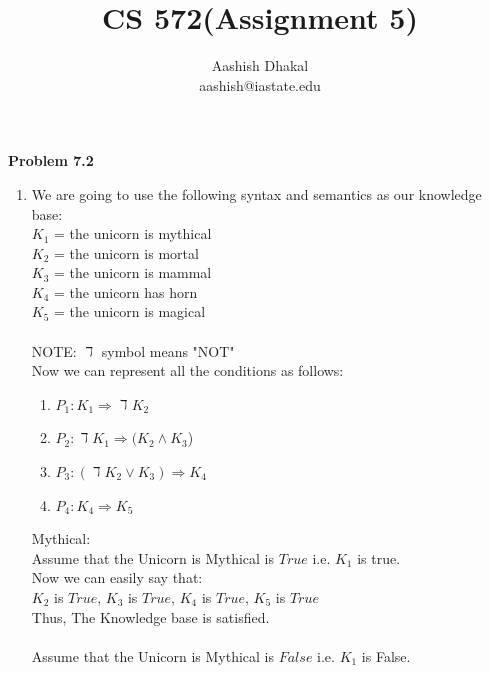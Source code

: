 \documentclass[11pt]{article}
\begin{document}
\title{CS 572(Assignment 5)} %
\author{Aashish Dhakal\\ %
aashish@iastate.edu\\%
 }      %
\date{}


\maketitle
\section*{}

\textbf{Problem 7.2}
\begin{enumerate}[label=(\alph*)]
  \item We are going to use the following syntax and semantics as our knowledge base:\\
  $K_1$ = the unicorn is mythical \\
  $K_2$ = the unicorn is mortal \\
  $K_3$ = the unicorn is mammal \\
  $K_4$ = the unicorn has horn \\
  $K_5$ = the unicorn is magical \\ \\
  NOTE: $\daleth$ symbol means "NOT" \\
  Now we can represent all the conditions as follows:
    \begin{enumerate}
      \item $P_1: K_1 \Rightarrow \daleth K_2$
      \item $P_2: \daleth K_1 \Rightarrow (K_2 \wedge K_3$)
      \item $P_3: (\daleth K_2 \vee K_3) \Rightarrow K_4$
      \item $P_4: K_4 \Rightarrow K_5$
    \end{enumerate}
  Mythical:\\
  Assume that the Unicorn is Mythical is $True$ i.e. $K_1$ is true.\\
  Now we can easily say that: \\
  $K_2$ is $True$,
  $K_3$ is $True$,
  $K_4$ is $True$,
  $K_5$ is $True$\\
  Thus, The Knowledge base is satisfied.\\ \\
  Assume that the Unicorn is Mythical is $False$ i.e. $K_1$ is False.\\

\end{enumerate}
\end{document}
